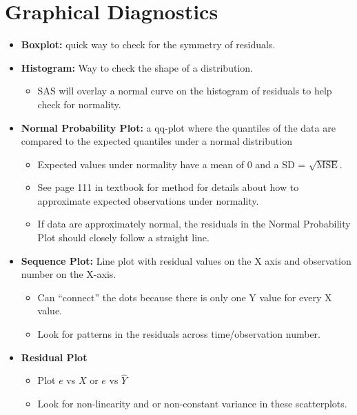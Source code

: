 \documentclass[12pt]{notes}
\begin{document}
\section{Graphical Diagnostics}
\begin{itemize}
\item \textbf{Boxplot:} quick way to check for the symmetry of residuals. 
\item \textbf{Histogram:} Way to check the shape of a distribution. 
\begin{itemize}
\item SAS will overlay a normal curve on the histogram of residuals to help check for normality. 
\end{itemize}
\item \textbf{Normal Probability Plot:} a qq-plot where the quantiles of the data are compared to the expected quantiles under a normal distribution
\begin{itemize}
\item Expected values under normality have a mean of $0$ and a SD = $\sqrt{\text{MSE}}.$
\item See page 111 in textbook for method for details about how to approximate expected observations under normality.  
\item If data are approximately normal, the residuals in the Normal Probability Plot should closely follow a straight line. 
\end{itemize}
\item \textbf{Sequence Plot:} Line plot with residual values on the X axis and observation number on the X-axis. 
\begin{itemize}
\item Can ``connect'' the dots because there is only one Y value for every X value. 
\item Look for patterns in the residuals across time/observation number. 
\end{itemize}
\item \textbf{Residual Plot}
\begin{itemize}
\item Plot $e$ vs $X$ or $e$ vs $\hat{Y}$
\item Look for non-linearity and or non-constant variance in these scatterplots.  
\end{itemize}
\end{itemize}
\end{document}
